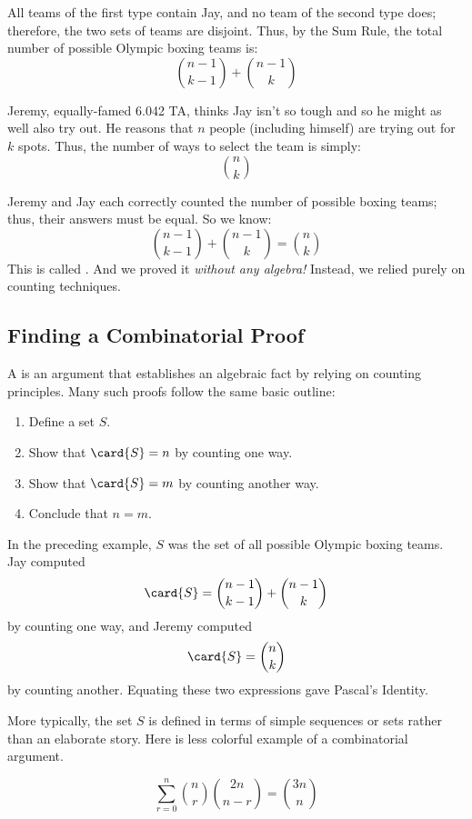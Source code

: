 All teams of the first type contain Jay, and no team of the second
type does; therefore, the two sets of teams are disjoint.  Thus, by
the Sum Rule, the total number of possible Olympic boxing teams is:
%
\[
\binom{n-1}{k-1} + \binom{n - 1}{k}
\]

Jeremy, equally-famed 6.042 TA, thinks Jay isn't so tough and so
he might as well also try out.  He reasons that $n$ people (including
himself) are trying out for $k$ spots.  Thus, the number of ways to
select the team is simply:
%
\[
\binom{n}{k}
\]

Jeremy and Jay each correctly counted the number of possible boxing
teams; thus, their answers must be equal.  So we know:
%
\[
\binom{n-1}{k-1} + \binom{n - 1}{k} = \binom{n}{k}
\]
%
This is called .  And we proved it
\emph{without any algebra!}  Instead, we relied purely on counting
techniques.

\subsection{Finding a Combinatorial Proof}

A  is an argument that establishes an
algebraic fact by relying on counting principles.  Many such proofs
follow the same basic outline:
%
\begin{enumerate}

\item Define a set $S$.

\item Show that $\card{S} = n$ by counting one way.

\item Show that $\card{S} = m$ by counting another way.

\item Conclude that $n = m$.

\end{enumerate}
%
In the preceding example, $S$ was the set of all possible Olympic boxing
teams.  Jay computed
\[
\card{S} = \binom{n-1}{k-1} + \binom{n-1}{k}
\]
by counting one way, and Jeremy computed
\[
\card{S} = \binom{n}{k}
\]
by counting another.  Equating these two expressions gave Pascal's
Identity.

More typically, the set $S$ is defined in terms of simple sequences or
sets rather than an elaborate story.  Here is less colorful example of a
combinatorial argument.

\begin{theorem}
\label{th:comb-ex}
\[
\sum_{r=0}^n \binom{n}{r} \binom{2n}{n-r} = \binom{3n}{n}
\]
\end{theorem}

